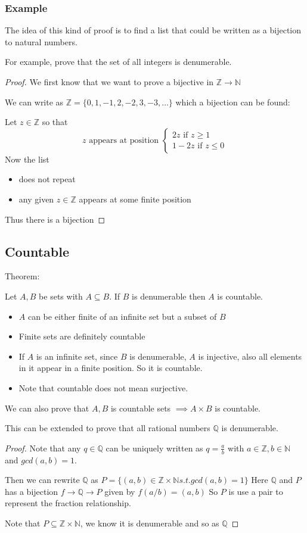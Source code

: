 \documentclass[letterpaper,12pt]{article}
\begin{document}
\subsubsection{Example}
The idea of this kind of proof is to find a list that could be written as a bijection to natural numbers.

For example, prove that the set of all integers is denumerable.\begin{proof}
    We first know that we want to prove a bijective in $\mathbb{Z}\to \mathbb{N}$

    We can write as $\mathbb{Z}=\{0,1,-1,2,-2,3,-3,\ldots\}$ which a bijection can be found:

    Let  $z\in \mathbb{Z}$ so that
    \begin{equation*}
        z\text{ appears at position }\begin{cases}
            2z\text{ if }z\ge 1\\
            1-2z\text{ if }z\le 0
        \end{cases}        
    \end{equation*}
    Now the list \begin{itemize}
        \item does not repeat
        \item any given $z\in\mathbb{Z}$ appears at some finite position
    \end{itemize}
    Thus there is a bijection
\end{proof}
\subsection{Countable}
Theorem:

Let $A,B$ be sets with $A\subseteq B$. If $B$ is denumerable then $A$ is countable.
\begin{itemize}
    \item $A$ can be either finite of an infinite set but a subset of $B$
    \item Finite sets are definitely countable
    \item If $A$ is an infinite set, since $B$ is denumerable, $A$ is injective, also all elements in it appear in a finite position. So it is countable. 
    \item Note that countable does not mean surjective.
\end{itemize}
We can also prove that $A, B$ is countable sets $\implies A\times B$ is countable.

This can be extended to prove that all rational numbers $\mathbb{Q}$ is denumerable.\begin{proof}
    Note that any $q\in \mathbb{Q}$ can be uniquely written as $q=\frac{a}{b}$ with $a\in \mathbb{Z},b\in \mathbb{N}$ and $gcd(a,b)=1$.

    Then we can rewrite $\mathbb{Q}$ as $P=\{(a,b)\in \mathbb{Z}\times \mathbb{N} s.t. gcd(a,b)=1\}$ Here $\mathbb{Q}$ and $P$ has a bijection $f\to \mathbb{Q}\to P$ given by $f(a/b)=(a,b)$ So $P$ is use a pair to represent the fraction relationship. 

    Note that $P\subseteq \mathbb{Z}\times \mathbb{N}$, we know it is denumerable and so as $\mathbb{Q}$
\end{proof}
\end{document}
